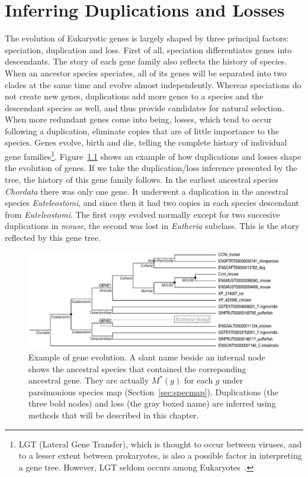\chapter{Inferring Duplications and Losses}\label{chap:dli}

The evolution of Eukaryotic genes is largely shaped by three principal factors:
speciation, duplication and loss. First of all, speciation differentiates genes into descendants.
The story of each gene family also reflects the history of species. When an ancestor species speciates,
all of its genes will be separated into two clades at the same time and evolve
almost independently. Whereas speciations do not create new genes, duplications add
more genes to a species and the descendant species as well, and thus provide
candidates for natural selection. When more redundant genes come into being, 
losses, which tend to occur following a duplication, eliminate copies that are
of little importance to the species. Genes evolve, birth and die, telling the
complete history of individual gene families\footnote{LGT (Lateral Gene Transfer),
which is thought to occur between viruses, and to a lesser extent between
prokaryotes, is also a possible factor in interpreting a gene tree. However, LGT seldom
occurs among Eukaryotes~\cite{stanhope01,salzberg01,roelofs01,frickey04}.}.
Figure~\ref{fig:exa-dup-loss} shows an example of how duplications and losses shape
the evolution of genes. If we take the duplication/loss inference presented by the tree,
the history of this gene family follows. In the earliest ancestral species {\it Chordata} there was only
one gene. It underwent a duplication in the ancestral species {\it Euteleostomi}, and since then
it had two copies in each species descendant from {\it Euteleostomi}.
The first copy evolved normally except for two succesive duplications in {\it mouse},
the second was lost in {\it Eutheria} subclass. This is the story reflected by this gene tree.

\begin{figure}[!hb]
\begin{center}
\includegraphics[width=\textwidth]{gtree}
\caption[Example of gene evolution]
{Example of gene evolution. A slant name beside an internal node
shows the ancestral species that contained the correponding ancestral gene. They are
actually $M^*(g)$ for each $g$ under parsimonious species map (Section~\ref{sec:specmap}). Duplications (the three bold nodes) and
loss (the gray boxed name) are inferred using methods that will be described in this chapter.}\label{fig:exa-dup-loss}
\end{center}
\end{figure}

